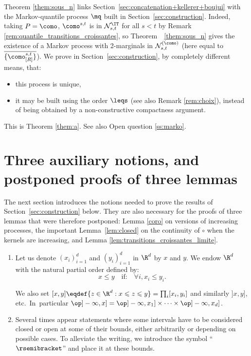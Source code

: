 Theorem \ref{them:sous_n} links Section~\ref{sec:concatenation+kellerer+boujui} with the Markov-quantile process $\mq$ built in Section~\ref{sec:construction}. Indeed, taking $P=\como$,
$\como^{s,t}$ is in $\mathcal{N}_{s,t}^\IT$ for all $s<t$ by Remark \ref{rem:quantile_transitions_croissantes}, so Theorem~ \ref{them:sous_n} gives the existence of a Markov process with 2-marginals in $\mathcal{N}_{s,t}^{\rm (\como)}$ (here equal to $\overline{\{\como_{[R]}^{s,t}\}}$). We prove in Section~\ref{sec:construction}, by completely different means, that:
\begin{itemize}
\item
this process is unique,

\item
it may be built using the order $\leqs$ (see also Remark \ref{rem:choix}), instead of being obtained by a non-constructive compactness argument.
\end{itemize}
This is Theorem \ref{them:a}. See also Open question \ref{ss:marko}.

\section{Three auxiliary notions, and postponed proofs of three lemmas}\label{sec:auxiliaire}

The next section introduces the notions needed to prove the results of Section~\ref{sec:construction} below. They are also necessary for the proofs of three lemmas that were therefore postponed: Lemma \ref{coro} on versions of increasing processes, the important Lemma~\ref{lem:closed} on the continuity of $\circ$ when the kernels are increasing, and Lemma \ref{lem:transitions_croissantes_limite}.

\label{subsec:stochastic_order}

\skpt
\begin{notation}\label{notation:intervallesRd}
\begin{enumerate}
\item
 Let us denote $(x_i)_{i=1}^d$ and $(y_i)_{i=1}^d$ in $\R^d$ by $x$ and $y$. We endow $\R^d$ with the natural partial order defined by:
\[x\leqslant y\quad \text{if:}\quad\forall i,x_i\leqslant y_i.\]

We also set $[x,y]\eqdef\{z\in\R^d:x\leqslant z\leqslant y\}=\prod_i[x_i,y_i]$ and similarly $]x,y]$, etc.\ In~particular $\op]-\infty,x]=\op]-\infty,x_1]\times\cdots\times\op]-\infty,x_d]$.

\item
Several times appear statements where some intervals have to be considered closed or open at some of their bounds, either arbitrarily or depending on possible cases. To alleviate the writing, we introduce the symbol ``$\rsemibracket$'' and place it at these bounds.
\end{enumerate}
\end{notation}

